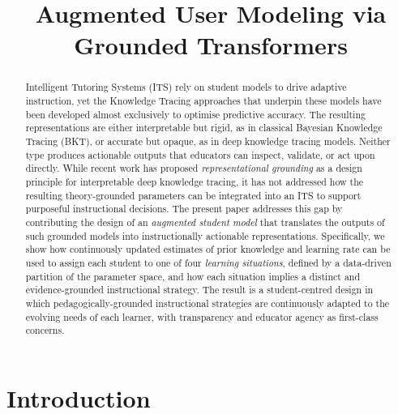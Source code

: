 \documentclass[runningheads]{llncs}
\begin{document}
%
\title{Augmented User Modeling via Grounded Transformers}
%
%
\authorrunning{}
%
\institute{}
%
\maketitle
%
\begin{abstract}

Intelligent Tutoring Systems (ITS) rely on student models to drive adaptive instruction, yet the Knowledge Tracing approaches that underpin these models have been developed almost exclusively to optimise predictive accuracy. The resulting representations are either interpretable but rigid, as in classical Bayesian Knowledge Tracing (BKT), or accurate but opaque, as in deep knowledge tracing models. Neither type produces actionable outputs that educators can inspect, validate, or act upon directly. While recent work has proposed \textit{representational grounding} as a design principle for interpretable deep knowledge tracing, it has not addressed how the resulting theory-grounded parameters can be integrated into an ITS to support purposeful instructional decisions. The present paper addresses this gap by contributing the design of an \textit{augmented student model} that translates the outputs of such grounded models into instructionally actionable representations. Specifically, we show how continuously updated estimates of prior knowledge and learning rate can be used to assign each student to one of four \textit{learning situations}, defined by a data-driven partition of the parameter space, and how each situation implies a distinct and evidence-grounded instructional strategy. The result is a student-centred design in which pedagogically-grounded instructional strategies are continuously adapted to the evolving needs of each learner, with transparency and educator agency as first-class concerns.

\end{abstract}
%
%
\section{Introduction}
\end{document}
